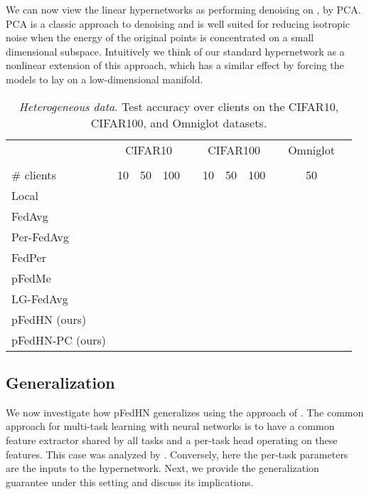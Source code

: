 \documentclass{article}
\newcommand\ourmethod{pFedHN}
\begin{document}
We can now view the linear hypernetworks as performing denoising on , by PCA. PCA is a classic approach to denoising \cite{PCAdenoising} and is well suited for reducing isotropic noise when the energy of the original points is concentrated on a small dimensional subspace. Intuitively we think of our standard hypernetwork as a nonlinear extension of this approach, which has a similar effect by forcing the models to lay on a low-dimensional manifold.

\setlength{\tabcolsep}{5pt}
\begin{table*}[t]
\scriptsize
    \centering
    \caption{\textit{Heterogeneous data}. Test accuracy over  clients on the CIFAR10, CIFAR100, and Omniglot datasets.}
    \vskip 0.11in
    \begin{tabular}{l c c c c c c c c c c}
    \toprule
    & \multicolumn{3}{c}{CIFAR10} & & \multicolumn{3}{c}{CIFAR100} && Omniglot\\
     \cmidrule{2-4}\cmidrule{6-8}\cmidrule{10-10}\\
     \# clients & 10 & 50 & 100  & &  10 & 50 & 100 && 50\\
    \midrule
    Local &  &  &  &&  &  &  &&  \\
    FedAvg &  &  &  &&  &  &  &&  \\
        \hline
    Per-FedAvg &  &  &  &&  &  &  && \\
    FedPer &  &   &  &&  &  &  &&  \\
    pFedMe &  &   &  &&  &  &  &&  \\
    LG-FedAvg &  &  &  &&  &  &  && \\
    \midrule
    \ourmethod{} (ours) &  &  &  &&   &  &  &&  
     \\
    \ourmethod{}-PC (ours) &  &  &  &&  &  &  &&  
     \\
    \bottomrule
    \end{tabular}
    \label{tab:hetro}
\end{table*}



\subsection{Generalization}

We now investigate how \ourmethod{} generalizes using the approach of \citet{baxter2000model}. The common approach for multi-task learning with neural networks is to have a common feature extractor shared by all tasks and a per-task head operating on these features. This case was analyzed by \citet{baxter2000model}.
Conversely, here the per-task parameters are the inputs to the hypernetwork. Next, we provide the generalization guarantee under this setting and discuss its implications.
\end{document}
